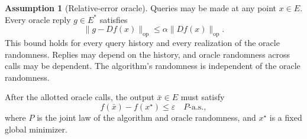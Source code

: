 \documentclass[10pt]{article}
\theoremstyle{definition}
\newtheorem{assumption}{Assumption}
\begin{document}
\begin{assumption}[Relative-error oracle]
Queries may be made at any point $x\in E$. Every oracle reply $g\in E^*$ satisfies
\[
\|g-Df(x)\|_{\mathrm{op}}
\leq\alpha\|Df(x)\|_{\mathrm{op}}.
\]
This bound holds for every query history and every realization of the oracle randomness. Replies may depend on the history, and oracle randomness across calls may be dependent. The algorithm's randomness is independent of the oracle randomness.
\end{assumption}

After the allotted oracle calls, the output $\bar{x}\in E$ must satisfy
\[
f(\bar{x})-f(x^\star)\leq\varepsilon
\quad P\text{-a.s.},
\]
where $P$ is the joint law of the algorithm and oracle randomness, and $x^\star$ is a fixed global minimizer.
\end{document}

